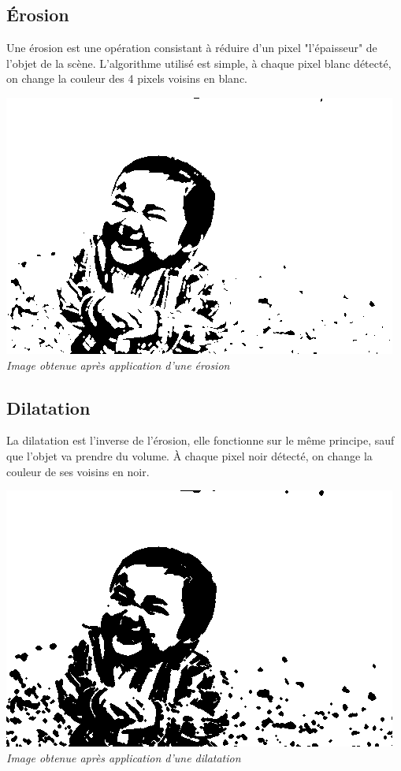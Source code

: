 \documentclass[a4paper,11pt]{article}
\begin{document}
\subsection{Érosion}
Une érosion est une opération consistant à réduire d'un pixel "l'épaisseur" de l'objet de la scène. L'algorithme utilisé est simple, à chaque pixel blanc détecté, on change la couleur des 4 pixels voisins en blanc.
\begin{center}
\includegraphics[scale=0.7]{babyerode.png}\\
\textit{Image obtenue après application d'une érosion}
\end{center}

\subsection{Dilatation}
La dilatation est l'inverse de l'érosion, elle fonctionne sur le même principe, sauf que l'objet va prendre du volume. À chaque pixel noir détecté, on change la couleur de ses voisins en noir.
\begin{center}
\includegraphics[scale=0.7]{babydilate.png}\\
\textit{Image obtenue après application d'une dilatation}
\end{center}
\end{document}
